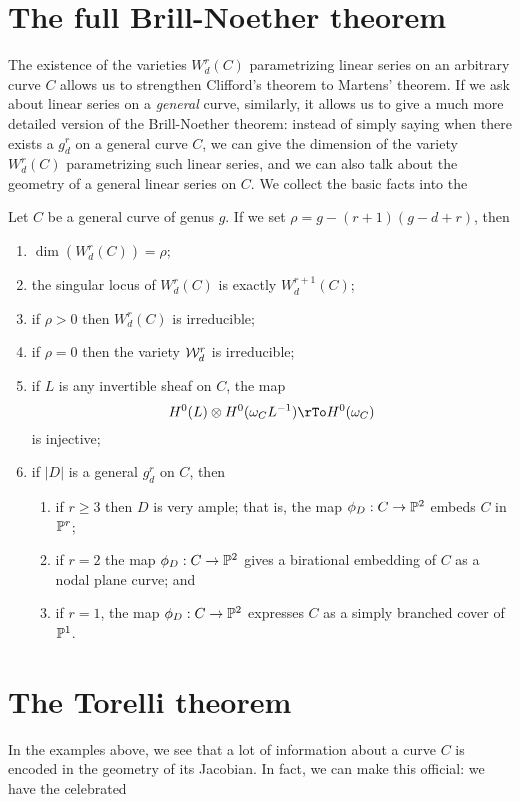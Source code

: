 \section{The full Brill-Noether theorem}

The existence of the varieties $W^r_d(C)$ parametrizing linear series on an arbitrary curve $C$ allows us to strengthen Clifford's theorem to Martens' theorem. If we ask about linear series on a \emph{general} curve, similarly, it allows us to give a much more detailed version of the Brill-Noether theorem: instead of simply saying when there exists a $g^r_d$ on a general curve $C$, we can give the dimension of the variety $W^r_d(C)$ parametrizing such linear series, and we can also talk about the geometry of a general linear series on $C$. We collect the basic facts into the 

\begin{theorem}
Let $C$ be a general curve of genus $g$. If we set $\rho = g - (r+1)(g-d+r)$, then
\begin{enumerate}
\item $\dim(W^r_d(C)) = \rho$;
\item the singular locus of $W^r_d(C)$ is exactly $W^{r+1}_d(C)$;
\item if $\rho > 0$ then $W^r_d(C)$ is irreducible;
\item if $\rho = 0$ then the variety ${\mathcal W}^r_d$ is irreducible;
\item if $L$ is any invertible sheaf on $C$, the map
$$
H^0(L) \otimes H^0(\omega_CL^{-1}) \rTo H^0(\omega_C)
$$
is injective;
\item if $|D|$ is a general $g^r_d$ on $C$, then
\begin{enumerate}
\item if $r \geq 3$ then $D$ is very ample; that is, the map $\phi_D : C \to {\mathbb P}^2$   embeds $C$ in ${\mathbb P}^r$;
\item if $r=2$ the map $\phi_D : C \to {\mathbb P}^2$ gives a birational embedding of $C$ as a nodal plane curve; and 
\item if $r=1$, the map $\phi_D : C \to {\mathbb P}^2$ expresses $C$ as a simply branched cover of ${\mathbb P}^1$.
\end{enumerate}
\end{enumerate}
\end{theorem}

\section{The Torelli theorem}
In the examples above, we see that a lot of information about a curve $C$ is encoded in the geometry of its Jacobian. In fact, we can make this official: we have the celebrated

